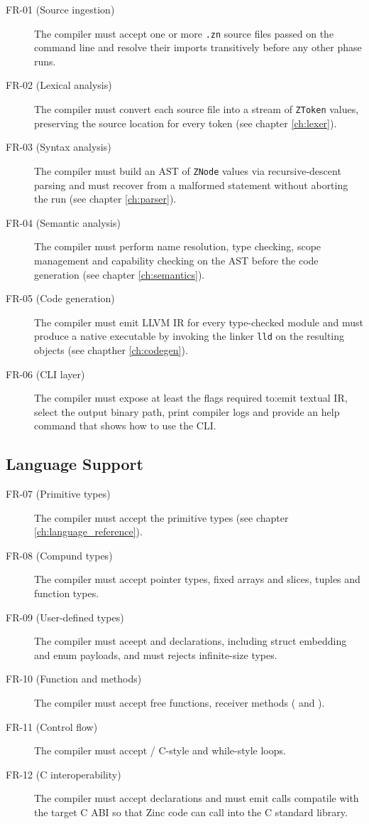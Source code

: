 \begin{description}
    \item[FR-01 (Source ingestion)] The compiler must accept one or more \texttt{.zn} source files passed on the command line and resolve their  imports transitively before any other phase runs.
    \item[FR-02 (Lexical analysis)] The compiler must convert each source file into a stream of \texttt{ZToken} values, preserving the source location for every token (see chapter \ref{ch:lexer}).
    \item[FR-03 (Syntax analysis)] The compiler must build an AST of \texttt{ZNode} values via recursive-descent parsing and must recover from a malformed statement without aborting the run (see chapter \ref{ch:parser}).
    \item[FR-04 (Semantic analysis)] The compiler must perform name resolution, type checking, scope management and capability checking on the AST before the code generation (see chapter \ref{ch:semantics}).
    \item[FR-05 (Code generation)] The compiler must emit LLVM IR for every type-checked module and must produce a native executable by invoking the linker \texttt{lld} on the resulting objects (see chapther \ref{ch:codegen}).
    \item[FR-06 (CLI layer)] The compiler must expose at least the flags required to:emit textual IR, select the output binary path, print compiler logs and provide an help command that shows how to use the CLI.
\end{description}

\subsection{Language Support}

\begin{description}
    \item[FR-07 (Primitive types)] The compiler must accept the primitive types (see chapter \ref{ch:language_reference}).
    \item[FR-08 (Compund types)] The compiler must accept pointer types, fixed arrays and slices, tuples and function types.
    \item[FR-09 (User-defined types)] The compiler must aceept  and  declarations, including struct embedding and enum payloads, and must rejects infinite-size types.
    \item[FR-10 (Function and methods)] The compiler must accept free functions, receiver methods ( and ).
    \item[FR-11 (Control flow)] The compiler must accept / C-style and while-style loops.
    \item[FR-12 (C interoperability)] The compiler must accept  declarations and must emit calls compatile with the target C ABI so that Zinc code can call into the C standard library.
\end{description}

